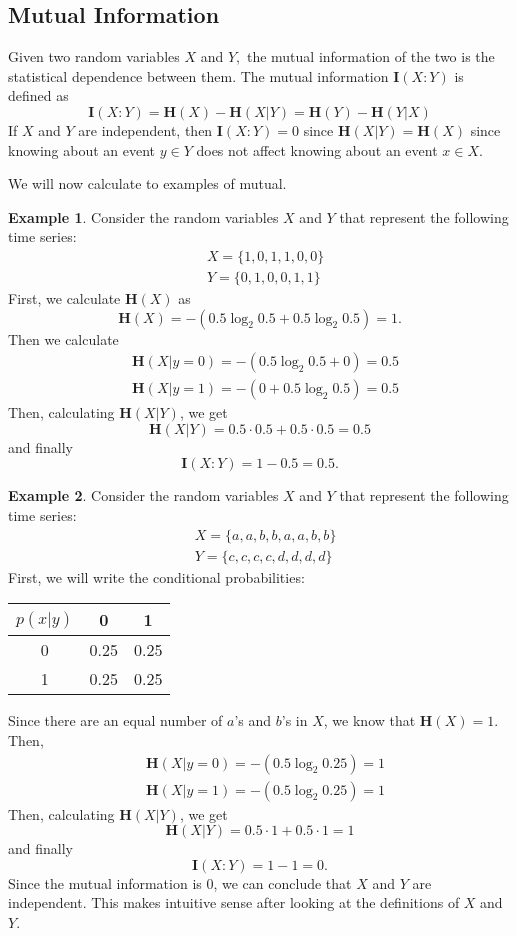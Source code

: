 \documentclass{article}
\theoremstyle{definition}
\newtheorem{example}{Example}[section]
\newcommand{\Hb}{\mathbf{H}}
\newcommand{\Ib}{\mathbf{I}}
\begin{document}
\subsection{Mutual Information}
Given two random variables $X$ and $Y,$ the mutual information of the two is the statistical dependence between them. The mutual information $\Ib(X : Y)$ is defined as 
\[\Ib(X : Y) = \Hb(X) - \Hb(X | Y) = \Hb(Y) - \Hb(Y|X) \]
If $X$ and $Y$ are independent, then $\Ib(X : Y) = 0$ since $\Hb(X|Y) =  \Hb(X)$ since knowing about an event $y \in Y$ does not affect knowing about an event $x \in X$. 

We will now calculate to examples of mutual.
\begin{example}
	 Consider the random variables $X$ and $Y$ that represent the following time series:
	\begin{align*}
	&X = \{1,0,1,1,0,0\} \\
	&Y = \{0,1,0,0,1,1\}
	\end{align*}
	First, we calculate $\Hb(X)$ as 
	\[\Hb(X) = -\left(0.5\log_2 0.5 + 0.5 \log_2 0.5\right) = 1.\]
	Then we calculate 
	\begin{align*}
	&\Hb(X | y = 0) = -\left(0.5\log_2 0.5 + 0\right) = 0.5\\
	&\Hb(X | y = 1) = -(0 + 0.5\log_2 0.5) = 0.5
	\end{align*}
	Then, calculating $\Hb(X | Y)$, we get
	\[\Hb(X | Y) = 0.5\cdot 0.5 + 0.5\cdot 0.5 = 0.5\]
	and finally
	\[\Ib(X : Y) = 1 - 0.5 = 0.5.\]
\end{example}
\begin{example}
	 Consider the random variables $X$ and $Y$ that represent the following time series:
	\begin{align*}
	&X = \{a,a,b,b,a,a,b,b\} \\
	&Y = \{c,c,c,c,d,d,d,d\}
	\end{align*}
	First, we will write the conditional probabilities:
	
	\begin{tabular}{c|cc}
		$p(x|y)$ & 0 & 1 \\\hline
		0 & 0.25 & 0.25 \\
		1 & 0.25 & 0.25
	\end{tabular}

	Since there are an equal number of $a$'s and $b$'s in $X$, we know that $\Hb(X) = 1$. Then,
	\begin{align*}
	&\Hb(X | y = 0) = -\left(0.5\log_2 0.25\right) = 1\\
	&\Hb(X | y = 1) = -(0.5\log_2 0.25) = 1
	\end{align*}
	Then, calculating $\Hb(X | Y)$, we get
	\[\Hb(X | Y) = 0.5\cdot 1 + 0.5\cdot 1 = 1\]
	and finally
	\[\Ib(X : Y) = 1 - 1 = 0.\]
	Since the mutual information is 0, we can conclude that $X$ and $Y$ are independent. This makes intuitive sense after looking at the definitions of $X$ and $Y$. 
\end{example}
\end{document}
